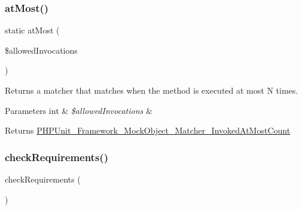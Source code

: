 \subsubsection{\texorpdfstring{at\+Most()}{atMost()}}
{\footnotesize\ttfamily static at\+Most (\begin{DoxyParamCaption}\item[{}]{\$allowed\+Invocations }\end{DoxyParamCaption})\hspace{0.3cm}{\ttfamily [static]}}

Returns a matcher that matches when the method is executed at most N times.


\begin{DoxyParams}[1]{Parameters}
int & {\em \$allowed\+Invocations} & \\
\hline
\end{DoxyParams}
\begin{DoxyReturn}{Returns}
\mbox{\hyperlink{class_p_h_p_unit___framework___mock_object___matcher___invoked_at_most_count}{P\+H\+P\+Unit\+\_\+\+Framework\+\_\+\+Mock\+Object\+\_\+\+Matcher\+\_\+\+Invoked\+At\+Most\+Count}} 
\end{DoxyReturn}
\mbox{\label{class_p_h_p_unit___framework___test_case_a675519dd67770964b90eddec9f8abe09}} 
\subsubsection{\texorpdfstring{check\+Requirements()}{checkRequirements()}}
{\footnotesize\ttfamily check\+Requirements (\begin{DoxyParamCaption}{ }\end{DoxyParamCaption})\hspace{0.3cm}{\ttfamily [protected]}}

\mbox{\label{class_p_h_p_unit___framework___test_case_ac751e87b3d4c4bf2feb03bee8b092755}} 

